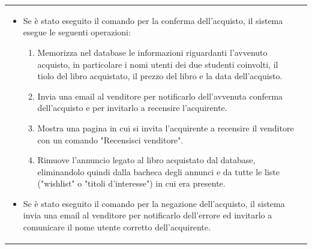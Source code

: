 \documentclass[10pt,a4paper]{article}
\begin{document}
\begin{tabular}{lp{}}
\begin{enumerate}
			\begin{itemize}
				\item Se è stato eseguito il comando per la conferma dell'acquisto, il sistema esegue le seguenti operazioni:
				\begin{enumerate}
					\item Memorizza nel database le informazioni riguardanti l'avvenuto acquisto, in particolare i nomi utenti dei due studenti coinvolti, il tiolo del libro acquistato, il prezzo del libro e la data dell'acquisto.
					\item Invia una email al venditore per notificarlo dell'avvenuta conferma dell'acquisto e per invitarlo a recensire l'acquirente.
					\item Mostra una pagina in cui si invita l'acquirente a recensire il venditore con un comando "Recensisci venditore".
					\item Rimuove l'annuncio legato al libro acquistato dal database, eliminandolo quindi dalla bacheca degli annunci e da tutte le liste ("wishlist" o "titoli d'interesse") in cui era presente.
				\end{enumerate}
				\item Se è stato eseguito il comando per la negazione dell'acquisto, il sistema invia una email al venditore per notificarlo dell'errore ed invitarlo a comunicare il nome utente corretto dell'acquirente.
			\end{itemize}
		\end{enumerate}
	\end{tabular}
\end{document}

